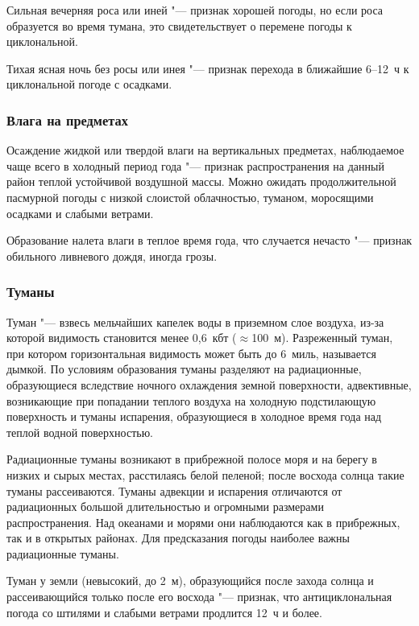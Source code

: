  Сильная вечерняя роса или иней "--- признак хорошей погоды, но
если роса образуется во время тумана, это свидетельствует о перемене
погоды к циклональной.

 Тихая ясная ночь без росы или инея "--- признак перехода в ближайшие
6--12~ч к циклональной погоде с осадками.

\subsubsection{Влага на предметах}

 Осаждение жидкой или твердой влаги на вертикальных предметах,
наблюдаемое чаще всего в холодный период года "--- признак
распространения на данный район теплой устойчивой воздушной массы.
Можно ожидать продолжительной пасмурной погоды с низкой слоистой
облачностью, туманом, моросящими осадками и слабыми ветрами.

 Образование налета влаги в теплое время года, что случается
нечасто "--- признак обильного ливневого дождя, иногда грозы.

\subsubsection{Туманы}

Туман "--- взвесь мельчайших капелек воды в приземном слое воздуха,
из-за которой видимость становится менее 0,6~кбт
($\approx{}$100~м). Разреженный туман, при котором горизонтальная
видимость может быть до 6~миль, называется дымкой. По условиям
образования туманы разделяют на радиационные, образующиеся вследствие
ночного охлаждения земной поверхности, адвективные, возникающие при
попадании теплого воздуха на холодную подстилающую поверхность и
туманы испарения, образующиеся в холодное время года над теплой водной
поверхностью.

Радиационные туманы возникают в прибрежной полосе моря и на берегу в
низких и сырых местах, расстилаясь белой пеленой; после восхода солнца
такие туманы рассеиваются. Туманы адвекции и испарения отличаются от
радиационных большой длительностью и огромными размерами
распространения. Над океанами и морями они наблюдаются как в
прибрежных, так и в открытых районах. Для предсказания погоды наиболее
важны радиационные туманы.

 Туман у земли (невысокий, до 2~м), образующийся после захода
солнца и рассеивающийся только после его восхода "--- признак, что
антициклональная погода со штилями и слабыми ветрами продлится 12~ч и
более.

